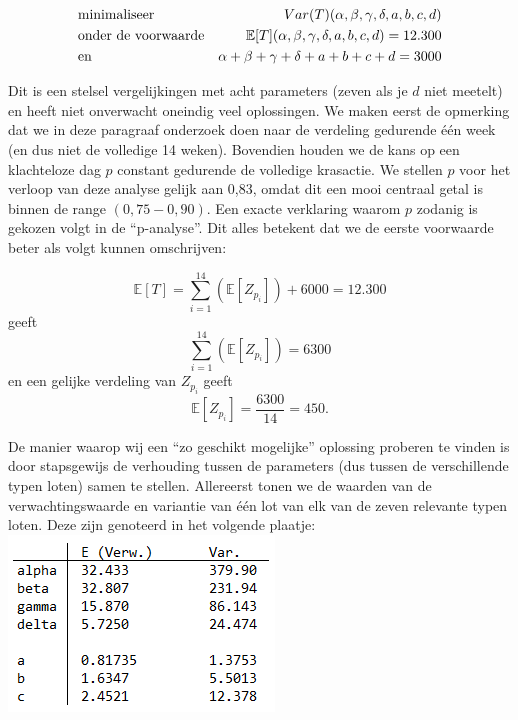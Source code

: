 \begin{eqnarray*}
\begin{aligned}
\lefteqn{\mbox{minimaliseer }}&& Var(T)(\alpha, \beta, \gamma, \delta, a,b,c,d)\\
&\mbox{onder de voorwaarde} & \mathbb{E}[T](\alpha, \beta, \gamma, \delta, a,b,c,d)= 12.300\\
&\mbox{en }& \alpha + \beta + \gamma + \delta + a + b+c+d = 3000
\end{aligned}
\end{eqnarray*}

Dit is een stelsel vergelijkingen met acht parameters (zeven als je $d$ niet meetelt) en heeft niet onverwacht oneindig veel oplossingen. We maken eerst de opmerking dat we in deze paragraaf onderzoek doen naar de verdeling gedurende één week (en dus niet de volledige 14 weken). Bovendien houden we de kans op een klachteloze dag $p$ constant gedurende de volledige krasactie. We stellen $p$ voor het verloop van deze analyse gelijk aan 0,83, omdat dit een mooi centraal getal is binnen de range $(0,75-0,90)$. Een exacte verklaring waarom $p$ zodanig is gekozen volgt in de ``p-analyse''. Dit alles betekent dat we de eerste voorwaarde beter als volgt kunnen omschrijven:

\begin{equation*}
\mathbb{E}[T]=\sum_{i=1}^{14} \left( \mathbb{E}[Z_{p_{i}}] \right) + 6000=12.300
\end{equation*}
geeft
\begin{equation*}
\sum_{i=1}^{14} \left( \mathbb{E}[Z_{p_{i}}] \right) =6300
\end{equation*}
en een gelijke verdeling van $Z_{p_{i}}$ geeft
\begin{equation*}
\mathbb{E}[Z_{p_{i}}]= \frac{6300}{14}=450.
\end{equation*}

 De manier waarop wij een ``zo geschikt mogelijke'' oplossing proberen te vinden is door stapsgewijs de verhouding tussen de parameters (dus tussen de verschillende typen loten) samen te stellen. Allereerst tonen we de waarden van de verwachtingswaarde en variantie van één lot van elk van de zeven relevante typen loten. Deze zijn genoteerd in het volgende plaatje:\\

\includegraphics[scale=0.8]{plaatje}

